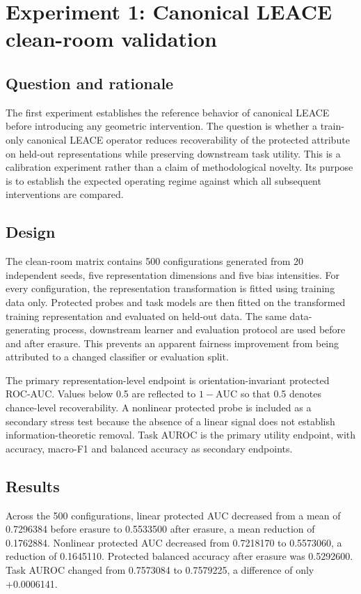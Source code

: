 
\section{Experiment 1: Canonical LEACE clean-room validation}
\label{sec:canonical-leace}

\subsection{Question and rationale}
The first experiment establishes the reference behavior of canonical LEACE before introducing any geometric intervention. The question is whether a train-only canonical LEACE operator reduces recoverability of the protected attribute on held-out representations while preserving downstream task utility. This is a calibration experiment rather than a claim of methodological novelty. Its purpose is to establish the expected operating regime against which all subsequent interventions are compared.

\subsection{Design}
The clean-room matrix contains 500 configurations generated from 20 independent seeds, five representation dimensions and five bias intensities. For every configuration, the representation transformation is fitted using training data only. Protected probes and task models are then fitted on the transformed training representation and evaluated on held-out data. The same data-generating process, downstream learner and evaluation protocol are used before and after erasure. This prevents an apparent fairness improvement from being attributed to a changed classifier or evaluation split.

The primary representation-level endpoint is orientation-invariant protected ROC-AUC. Values below 0.5 are reflected to $1-\mathrm{AUC}$ so that 0.5 denotes chance-level recoverability. A nonlinear protected probe is included as a secondary stress test because the absence of a linear signal does not establish information-theoretic removal. Task AUROC is the primary utility endpoint, with accuracy, macro-F1 and balanced accuracy as secondary endpoints.

\subsection{Results}
Across the 500 configurations, linear protected AUC decreased from a mean of 0.7296384 before erasure to 0.5533500 after erasure, a mean reduction of 0.1762884. Nonlinear protected AUC decreased from 0.7218170 to 0.5573060, a reduction of 0.1645110. Protected balanced accuracy after erasure was 0.5292600. Task AUROC changed from 0.7573084 to 0.7579225, a difference of only +0.0006141.

